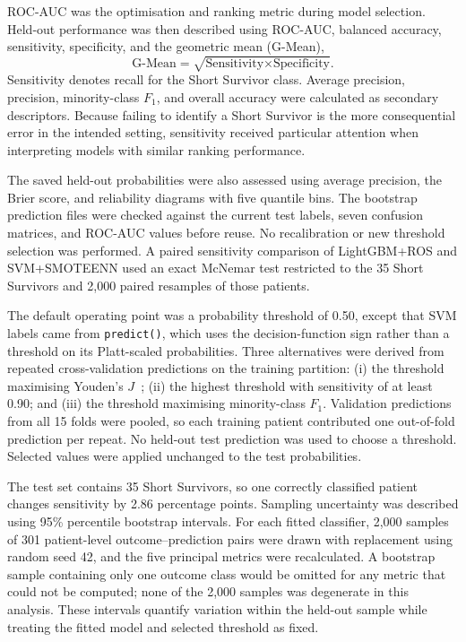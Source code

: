 ROC-AUC was the optimisation and ranking metric during model selection. Held-out performance was then described using ROC-AUC, balanced accuracy, sensitivity, specificity, and the geometric mean (\gls{G-Mean}),
\[
  \text{G-Mean}=\sqrt{\text{Sensitivity}\times\text{Specificity}}.
\]
Sensitivity denotes recall for the Short Survivor class. Average precision, precision, minority-class $F_1$, and overall accuracy were calculated as secondary descriptors. Because failing to identify a Short Survivor is the more consequential error in the intended setting, sensitivity received particular attention when interpreting models with similar ranking performance.

The saved held-out probabilities were also assessed using average precision, the Brier score, and reliability diagrams with five quantile bins. The bootstrap prediction files were checked against the current test labels, seven confusion matrices, and ROC-AUC values before reuse. No recalibration or new threshold selection was performed. A paired sensitivity comparison of LightGBM+ROS and SVM+SMOTEENN used an exact McNemar test restricted to the 35 Short Survivors and 2,000 paired resamples of those patients.

The default operating point was a probability threshold of 0.50, except that SVM labels came from \texttt{predict()}, which uses the decision-function sign rather than a threshold on its Platt-scaled probabilities. Three alternatives were derived from repeated cross-validation predictions on the training partition: (i) the threshold maximising Youden's $J$~\cite{youden1950}; (ii) the highest threshold with sensitivity of at least 0.90; and (iii) the threshold maximising minority-class $F_1$. Validation predictions from all 15 folds were pooled, so each training patient contributed one out-of-fold prediction per repeat. No held-out test prediction was used to choose a threshold. Selected values were applied unchanged to the test probabilities.

The test set contains 35 Short Survivors, so one correctly classified patient changes sensitivity by 2.86 percentage points. Sampling uncertainty was described using 95\% percentile bootstrap intervals. For each fitted classifier, 2,000 samples of 301 patient-level outcome--prediction pairs were drawn with replacement using random seed 42, and the five principal metrics were recalculated. A bootstrap sample containing only one outcome class would be omitted for any metric that could not be computed; none of the 2,000 samples was degenerate in this analysis. These intervals quantify variation within the held-out sample while treating the fitted model and selected threshold as fixed.

